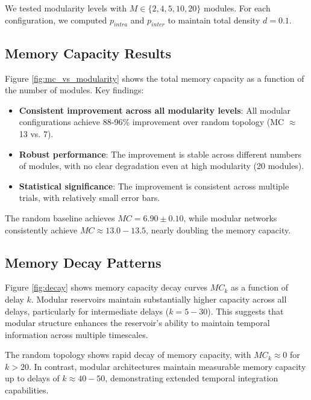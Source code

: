 \documentclass{article}
\begin{document}
We tested modularity levels with $M \in \{2, 4, 5, 10, 20\}$ modules. For each configuration, we computed $p_{intra}$ and $p_{inter}$ to maintain total density $d = 0.1$.

\subsection{Memory Capacity Results}

Figure \ref{fig:mc_vs_modularity} shows the total memory capacity as a function of the number of modules. Key findings:

\begin{itemize}
\item \textbf{Consistent improvement across all modularity levels}: All modular configurations achieve 88-96\% improvement over random topology (MC $\approx$ 13 vs. 7).
\item \textbf{Robust performance}: The improvement is stable across different numbers of modules, with no clear degradation even at high modularity (20 modules).
\item \textbf{Statistical significance}: The improvement is consistent across multiple trials, with relatively small error bars.
\end{itemize}

The random baseline achieves $MC = 6.90 \pm 0.10$, while modular networks consistently achieve $MC \approx 13.0-13.5$, nearly doubling the memory capacity.

\subsection{Memory Decay Patterns}

Figure \ref{fig:decay} shows memory capacity decay curves $MC_k$ as a function of delay $k$. Modular reservoirs maintain substantially higher capacity across all delays, particularly for intermediate delays ($k = 5-30$). This suggests that modular structure enhances the reservoir's ability to maintain temporal information across multiple timescales.

The random topology shows rapid decay of memory capacity, with $MC_k \approx 0$ for $k > 20$. In contrast, modular architectures maintain measurable memory capacity up to delays of $k \approx 40-50$, demonstrating extended temporal integration capabilities.
\end{document}
